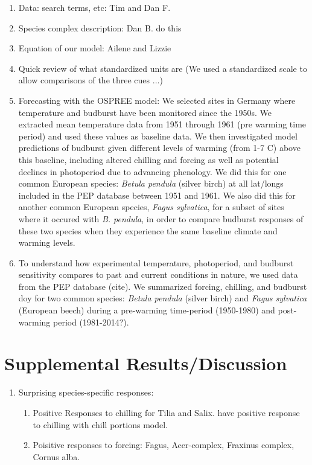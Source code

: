 \documentclass{article}
\begin{document}
\begin{enumerate}
\item Data: search terms, etc: Tim and Dan F.

\item Species complex description: Dan B. do this

\item Equation of our model: Ailene and Lizzie

\item Quick review of what standardized units are (We used a standardized scale to allow comparisons of the three cues ...)

\item Forecasting with the OSPREE model: We selected sites in Germany where temperature and budburst have been monitored since the 1950s. We extracted mean temperature data from 1951 through 1961 (pre warming time period) and used these values as baseline data. We then investigated model predictions of budburst given different levels of warming (from 1-7 \degree C) above this baseline, including altered chilling and forcing as well as potential declines in photoperiod due to advancing phenology. We did this for one common European species: \emph{Betula pendula} (silver birch) at all lat/longs included in the PEP database between 1951 and 1961. We also did this for another common European species, \emph{Fagus sylvatica}, for a subset of sites where it occured with \emph{B. pendula}, in order to compare budburst responses of these two species when they experience the same baseline climate and warming levels.

\item  To understand how experimental temperature, photoperiod, and budburst sensitivity compares to past and current conditions in nature, we used data from the PEP database (cite). We summarized forcing, chilling, and budburst doy for two common species: \emph{Betula pendula} (silver birch) and \emph{Fagus sylvatica} (European beech) during a pre-warming time-period (1950-1980) and post-warming period (1981-2014?). 

\end{enumerate}
\section*{Supplemental Results/Discussion}
\begin{enumerate}
\item Surprising species-specific responses: 
\begin{enumerate}
\item Positive Responses to chilling for Tilia and Salix.  have positive response to chilling with chill portions model.

\item Poisitive responses to forcing: Fagus, Acer-complex, Fraxinus complex, Cornus alba.
\end{enumerate}
\end{enumerate}
\end{document}
